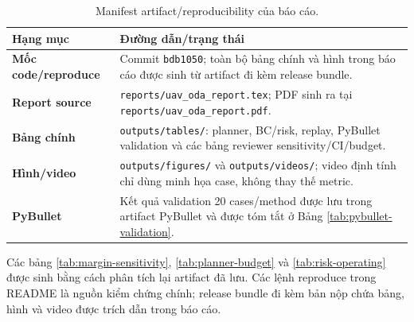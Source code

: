 \documentclass[10pt,letterpaper,twocolumn]{article}
\newcommand{\code}[1]{\texttt{#1}}
\newcommand{\pathcode}[1]{\nolinkurl{#1}}
\begin{document}
\begin{table}[!t]
\centering
\footnotesize
\caption{Manifest artifact/reproducibility của báo cáo.}
\label{tab:artifact-manifest}
\begin{tabularx}{\columnwidth}{>{\bfseries}p{2.45cm} X}
\toprule
Hạng mục & Đường dẫn/trạng thái \\
\midrule
Mốc code/reproduce & Commit \code{bdb1050}; toàn bộ bảng chính và hình trong báo cáo được sinh từ artifact đi kèm release bundle. \\
Report source & \pathcode{reports/uav_oda_report.tex}; PDF sinh ra tại \pathcode{reports/uav_oda_report.pdf}. \\
Bảng chính & \pathcode{outputs/tables/}: planner, BC/risk, replay, PyBullet validation và các bảng reviewer sensitivity/CI/budget. \\
Hình/video & \pathcode{outputs/figures/} và \pathcode{outputs/videos/}; video định tính chỉ dùng minh họa case, không thay thế metric. \\
PyBullet & Kết quả validation 20 cases/method được lưu trong artifact PyBullet và được tóm tắt ở Bảng \ref{tab:pybullet-validation}. \\
\bottomrule
\end{tabularx}
\end{table}

Các bảng \ref{tab:margin-sensitivity}, \ref{tab:planner-budget} và \ref{tab:risk-operating} được sinh bằng cách phân tích lại artifact đã lưu. Các lệnh reproduce trong README là nguồn kiểm chứng chính; release bundle đi kèm bản nộp chứa bảng, hình và video được trích dẫn trong báo cáo.
\end{document}
